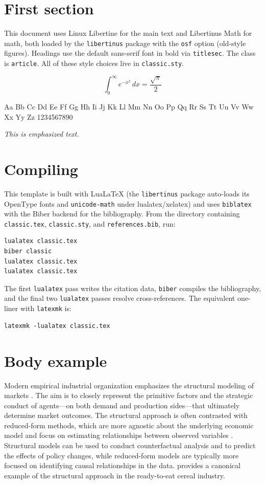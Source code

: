 \documentclass[11pt]{article}
\begin{document}
\section{First section}
This document uses Linux Libertine for the main text and Libertinus Math for
math, both loaded by the \texttt{libertinus} package with the \texttt{osf}
option (old-style figures). Headings use the default sans-serif font in bold
via \texttt{titlesec}. The class is \texttt{article}. All of these style
choices live in \texttt{classic.sty}.

$$ \int_0^\infty e^{-x^2}\, dx = \frac{\sqrt{\pi}}{2} $$

Aa Bb Cc Dd Ee Ff Gg Hh Ii Jj Kk Ll Mm Nn Oo Pp Qq Rr Ss Tt Uu Vv Ww Xx Yy Zz
1234567890

\emph{This is emphasized text.}

\section{Compiling}
This template is built with Lua\LaTeX{} (the \texttt{libertinus} package
auto-loads its OpenType fonts and \texttt{unicode-math} under lualatex/xelatex)
and uses \texttt{biblatex} with the Biber backend for the bibliography. From
the directory containing \texttt{classic.tex}, \texttt{classic.sty}, and
\texttt{references.bib}, run:

\begin{verbatim}
lualatex classic.tex
biber classic
lualatex classic.tex
lualatex classic.tex
\end{verbatim}

The first \texttt{lualatex} pass writes the citation data, \texttt{biber}
compiles the bibliography, and the final two \texttt{lualatex} passes resolve
cross-references. The equivalent one-liner with \texttt{latexmk} is:

\begin{verbatim}
latexmk -lualatex classic.tex
\end{verbatim}

\section{Body example}
Modern empirical industrial organization emphasizes the structural modeling of
markets \citep{ackerberg2007econometric}. The aim is to closely represent the
primitive factors and the strategic conduct of agents---on both demand and
production sides---that ultimately determine market outcomes. The structural
approach is often contrasted with reduced-form methods, which are more agnostic
about the underlying economic model and focus on estimating relationships
between observed variables \citep{angrist2010credibility}. Structural models can
be used to conduct counterfactual analysis and to predict the effects of policy
changes, while reduced-form models are typically more focused on identifying
causal relationships in the data. \citet{nevo2001measuring} provides a canonical
example of the structural approach in the ready-to-eat cereal industry.

\printbibliography
\end{document}
